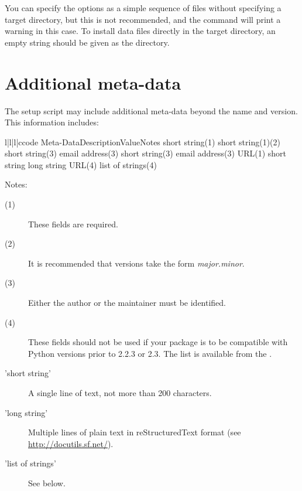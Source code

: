 \documentclass{manual}
\begin{document}
You can specify the  options as a simple sequence
of files without specifying a target directory, but this is not recommended,
and the  command will print a warning in this case.
To install data files directly in the target directory, an empty
string should be given as the directory.

\section{Additional meta-data}
\label{meta-data}

The setup script may include additional meta-data beyond the name and
version. This information includes:

\begin{tableiv}{l|l|l|c}{code}%
  {Meta-Data}{Description}{Value}{Notes}
         {short string}{(1)}
         {short string}{(1)(2)}
         {short string}{(3)}
         {email address}{(3)}
         {short string}{(3)}
         {email address}{(3)}
         {URL}{(1)}
         {short string}{}
         {long string}{}
         {URL}{(4)}
         {list of strings}{(4)}
\end{tableiv}

\noindent Notes:
\begin{description}
\item[(1)] These fields are required.
\item[(2)] It is recommended that versions take the form
  \emph{major.minor}.
\item[(3)] Either the author or the maintainer must be identified.
\item[(4)] These fields should not be used if your package is to be
  compatible with Python versions prior to 2.2.3 or 2.3.  The list is
  available from the .

\item['short string'] A single line of text, not more than 200 characters.
\item['long string'] Multiple lines of plain text in reStructuredText
  format (see \url{http://docutils.sf.net/}).
\item['list of strings'] See below.
\end{description}
\end{document}
